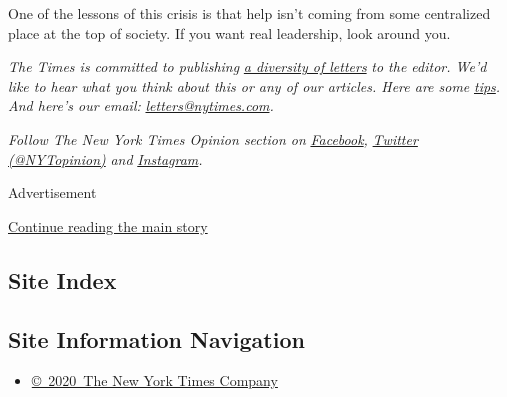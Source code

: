 One of the lessons of this crisis is that help isn't coming from some
centralized place at the top of society. If you want real leadership,
look around you.

\emph{The Times is committed to publishing}
\href{https://www.nytimes.com/2019/01/31/opinion/letters/letters-to-editor-new-york-times-women.html}{\emph{a
diversity of letters}} \emph{to the editor. We'd like to hear what you
think about this or any of our articles. Here are some}
\href{https://help.nytimes.com/hc/en-us/articles/115014925288-How-to-submit-a-letter-to-the-editor}{\emph{tips}}\emph{.
And here's our email:}
\href{mailto:letters@nytimes.com}{\emph{letters@nytimes.com}}\emph{.}

\emph{Follow The New York Times Opinion section on}
\href{https://www.facebook.com/nytopinion}{\emph{Facebook}}\emph{,}
\href{http://twitter.com/NYTOpinion}{\emph{Twitter (@NYTopinion)}}
\emph{and}
\href{https://www.instagram.com/nytopinion/}{\emph{Instagram}}\emph{.}

Advertisement

\protect\hyperlink{after-bottom}{Continue reading the main story}

\hypertarget{site-index}{%
\subsection{Site Index}\label{site-index}}

\hypertarget{site-information-navigation}{%
\subsection{Site Information
Navigation}\label{site-information-navigation}}

\begin{itemize}
\tightlist
\item
  \href{https://help.nytimes.com/hc/en-us/articles/115014792127-Copyright-notice}{©~2020~The
  New York Times Company}
\end{itemize}

